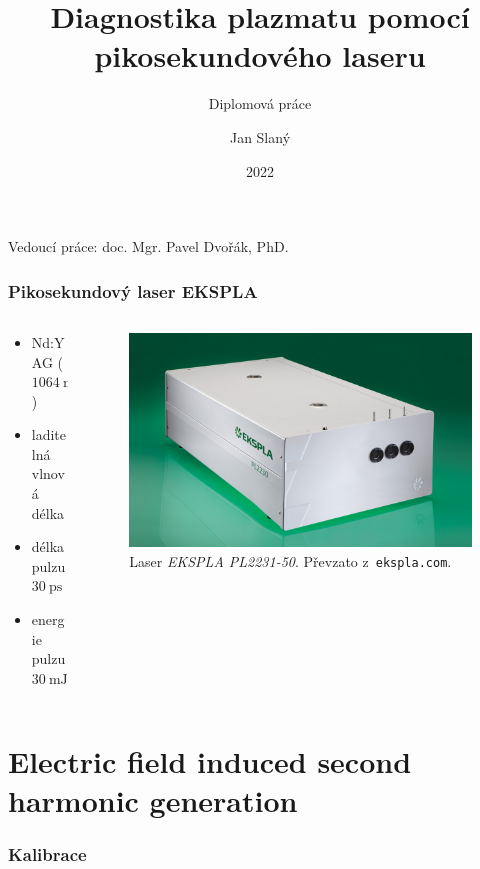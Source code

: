 \documentclass{beamer}
\title[Laserová diagnostika plazmatu]
{Diagnostika plazmatu pomocí pikosekundového laseru}
\subtitle{Diplomová práce}
\date{2022}
\author{Jan Slaný}
\institute[PřF MUNI]{Přírodovědecká fakulta Masarykovy univerzity\\
	Ústav fyzikální elektroniky}
\begin{document}
\begin{frame}[plain]
	\titlepage
	\footnotesize
	Vedoucí práce: \hfill doc. Mgr. Pavel Dvořák, PhD.
\end{frame}

\begin{frame}
	\frametitle{Pikosekundový laser EKSPLA}
	\begin{columns}
	\begin{column}{0.5\textwidth}
		\begin{itemize}
			\item Nd:YAG ($\SI{1064}{\nano\metre}$)
			\item laditelná vlnová délka
			\item délka pulzu $\SI{30}{\pico\second}$
			\item energie pulzu $\SI{30}{\milli\joule}$
		\end{itemize}
	\end{column}
	\begin{column}{0.5\textwidth}
		\begin{figure}
			\centering
			\includegraphics[width=\textwidth]{laser}
			\caption{Laser \emph{EKSPLA PL2231-50}.
				Převzato z~\texttt{ekspla.com}.}
		\end{figure}
	\end{column}
	\end{columns}
\end{frame}

\section[E-FISH]{Electric field induced second harmonic generation}

\begin{frame}
	\frametitle{Kalibrace}
	\graphicspath{{../efish/}}
	
\end{frame}
\end{document}

